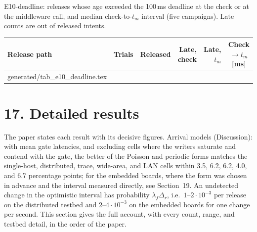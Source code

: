 \documentclass[11pt]{article}
\makeatletter
\newcommand{\gen}[1]{\@@input generated/#1.tex }
\makeatother
\begin{document}
\noindent E10-deadline: releases whose age exceeded the 100\,ms deadline at the check or at the middleware call, and median check-to-$t_m$ interval (five campaigns). Late counts are out of released intents.
\begin{center}
\footnotesize
\setlength{\tabcolsep}{4pt}
\begin{tabular}{@{}lrrrrc@{}}
\toprule
\textbf{Release path} & \textbf{Trials} & \textbf{Released} & \textbf{Late, check} & \textbf{Late, $t_m$} & \textbf{Check$\to t_m$ [ms]} \\
\midrule
\gen{tab_e10_deadline}
\bottomrule
\end{tabular}
\end{center}

\section*{17. Detailed results}
The paper states each result with its decisive figures. Arrival models (Discussion): with mean gate latencies, and excluding cells where the writers saturate and contend with the gate, the better of the Poisson and periodic forms matches the single-host, distributed, trace, wide-area, and LAN cells within 3.5, 6.2, 6.2, 4.0, and 6.7 percentage points; for the embedded boards, where the form was chosen in advance and the interval measured directly, see Section~19. An undetected change in the optimistic interval has probability $\lambda_f\Delta_r$, i.e.\ $1$--$2\cdot10^{-3}$ per release on the distributed testbed and $2$--$4\cdot10^{-3}$ on the embedded boards for one change per second. This section gives the full account, with every count, range, and testbed detail, in the order of the paper.
\end{document}
